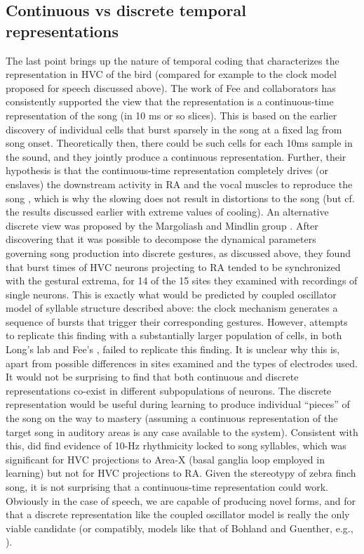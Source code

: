 \documentclass[output=paper,
modfonts
]{LSP/langsci}
\begin{document}
\subsection{Continuous vs discrete temporal representations}
The last point brings up the nature of temporal coding that characterizes the representation in HVC of the bird (compared for example to the clock model proposed for speech discussed above). The work of Fee and collaborators has consistently supported the view that the representation is a continuous-time representation of the song (in 10 ms or so slices). This is based on the earlier discovery  \citep{Hahnloser2002}
of individual cells that burst sparsely in the song at a fixed lag from song onset. Theoretically then, there could be such cells for each 10ms sample in the sound, and they jointly produce a continuous representation. Further, their hypothesis is that the continuous-time representation completely drives (or enslaves) the downstream activity in RA and the vocal muscles to reproduce the song \citep{Long2008}, which is why the slowing does not result in distortions to the song (but cf. the results discussed earlier with extreme values of cooling). An alternative discrete view was proposed by the Margoliash and Mindlin group \citep{Amador2013}. After discovering that it was possible to decompose the dynamical parameters governing song production into discrete gestures, as discussed above, they found that burst times of HVC neurons projecting to RA tended to be synchronized with the gestural extrema, for 14 of the 15 sites they examined with recordings of single neurons. This is exactly what would be predicted by coupled oscillator model of syllable structure described above: the clock mechanism generates a sequence of bursts that trigger their corresponding gestures. However, attempts to replicate this finding with a substantially larger population of cells, in both Long's lab \citep{Picardo2016} and Fee's \citep{Lynch2016}, failed to replicate this finding. It is unclear why this is, apart from possible differences in sites examined and the types of electrodes used. It would not be surprising to find that both continuous and discrete representations co-exist in different subpopulations of neurons. The discrete representation would be useful during learning to produce individual ``pieces'' of the song on the way to mastery (assuming a continuous representation of the target song in auditory areas is any case available to the system). Consistent with this, \cite{Lynch2016} did find evidence of 10-Hz rhythmicity locked to song syllables, which was significant for HVC projections to Area-X (basal ganglia loop employed in learning) but not for HVC projections to RA. Given the stereotypy of zebra finch song, it is not surprising that a continuous-time representation could work. Obviously in the case of speech, we are capable of producing novel forms, and for that a discrete representation like the coupled oscillator model is really the only viable candidate (or compatibly,  models like that of Bohland and Guenther, e.g., \citet{Bohland2010}).
\end{document}
